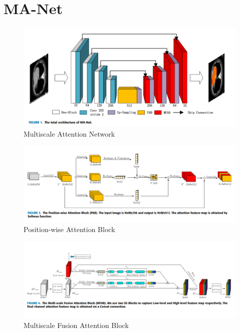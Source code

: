 \documentclass[11pt]{beamer}
\begin{document}
\section{MA-Net}
\begin{figure}
  \begin{center}
    \includegraphics[scale=1.1]{images/manet.png}
  \end{center}
  \caption{Multiscale Attention Network}\label{fig:}
\end{figure}
\begin{figure}
  \begin{center}
    \includegraphics[scale=1.1]{images/pab.png}
  \end{center}
  \caption{Position-wise Attention Block}\label{fig:}
\end{figure}
\begin{figure}
  \begin{center}
    \includegraphics[scale=1.1]{images/mfab.png}
  \end{center}
  \caption{Multiscale Fusion Attention Block}\label{fig:}
\end{figure}
\end{document}
